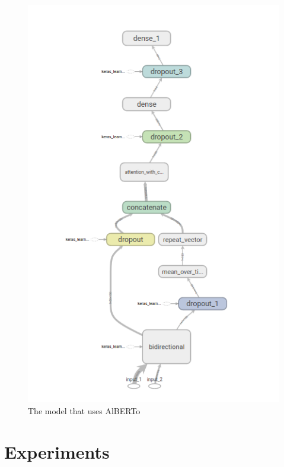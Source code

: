 \documentclass{article}
\begin{document}
            \begin{figure}
            \includegraphics[width=\linewidth]{alberto_model.png}
            \caption{The model that uses AlBERTo}
            \label{fig:alberto_model}
        \end{figure}

    \section{Experiments}\label{sec:s4}
\end{document}
